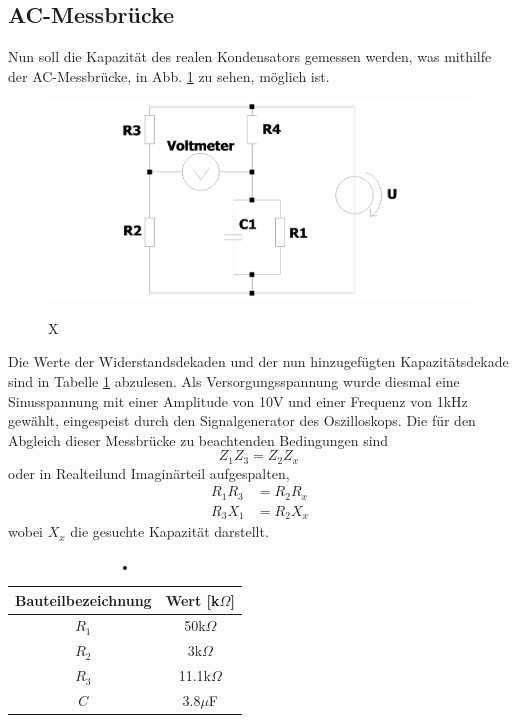 \subsection{AC-Messbrücke}
Nun soll die Kapazität des realen Kondensators gemessen werden, was mithilfe der AC-Messbrücke, in Abb. \ref{fig:ac_messbruecke} zu sehen, möglich ist. 
\begin{figure}[H]
	\includegraphics[width=\textwidth]{./img/ch3/AC_Wheatstone_Messbruecke.png}
	\label{fig:ac_messbruecke}
	\caption{X}
\end{figure}
Die Werte der Widerstandsdekaden und der nun hinzugefügten Kapazitätsdekade sind in Tabelle \ref{tb:ac_bt} abzulesen. Als Versorgungsspannung wurde diesmal eine Sinusspannung mit einer Amplitude von 10V und einer Frequenz von 1kHz gewählt, eingespeist durch den Signalgenerator des Oszilloskops. Die für den Abgleich dieser Messbrücke zu beachtenden Bedingungen sind
\begin{equation}
	Z_1 Z_3 = Z_2 Z_x\,
\end{equation}
oder in Realteilund Imaginärteil aufgespalten, 
\begin{align*}
	R_1 R_3 &= R_2 R_x \\ 
 	R_3 X_1 &= R_2 X_x 
\end{align*}
wobei $X_x$ die gesuchte Kapazität darstellt.
\begin{table}[h]
	\begin{tabular}{|c|c|}
	\hline 
	Bauteilbezeichnung & Wert [k$\Omega$] \\ 
	\hline 
	$R_1$ & 50k$\Omega$ \\ 
	\hline 
	$R_2$ & 3k$\Omega$ \\ 
	\hline 
	$R_3$ & 11.1k$\Omega$ \\ 
	\hline 
	$C$ & 3.8$\mu$F \\ 
	\hline 
	\end{tabular}
	\centering
	\label{tb:ac_bt}
	\caption{•}
\end{table}
